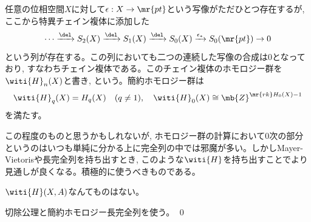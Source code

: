 任意の位相空間$X$に対して$\epsilon:X\to \mr{pt}$という写像がただひとつ存在するが, ここから特異チェイン複体に添加した
\[\cdots\xrightarrow{\del} S_{2}(X) \xrightarrow{\del} S_{1}(X) \xrightarrow{\del} S_{0}(X) \xrightarrow{\epsilon_{\ast}} S_{0}(\mr{pt}) \to 0\]
という列が存在する。この列においても二つの連続した写像の合成は$0$となっており, すなわちチェイン複体である。このチェイン複体のホモロジー群を$\witi{H}_{n}(X)$と書き, という。簡約ホモロジー群は
\[\witi{H}_{q}(X) = H_{q}(X)\quad (q\neq 1), \quad \witi{H}_{0}(X) \cong \mb{Z}^{\mr{rk}H_{0}(X) - 1}\]
を満たす。
\begin{tips}
この程度のものと思うかもしれないが, ホモロジー群の計算において$0$次の部分というのはいつも単純に分かる上に完全列の中では邪魔が多い。しかしMayer-Vietorisや長完全列を持ち出すとき, このような$\witi{H}$を持ち出すことでより見通しが良くなる。積極的に使うべきものである。
\end{tips}
\begin{rem}
$\witi{H}(X,A)$なんてものはない。
\end{rem}
\prf 
\ben
\item
\item
\item
\item
\item
\item 切除公理と簡約ホモロジー長完全列を使う。
\een
\qed


